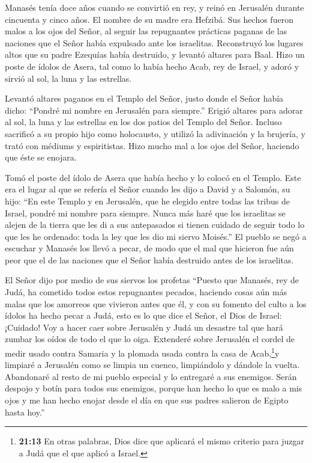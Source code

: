  Manasés tenía doce años cuando se convirtió en rey, y reinó
en Jerusalén durante cincuenta y cinco años. El nombre de su madre era
Hefzibá.  Sus hechos fueron malos a los ojos del Señor, al
seguir las repugnantes prácticas paganas de las naciones que el Señor
había expulsado ante los israelitas.  Reconstruyó los
lugares altos que su padre Ezequías había destruido, y levantó altares
para Baal. Hizo un poste de ídolos de Asera, tal como lo había hecho
Acab, rey de Israel, y adoró y sirvió al sol, la luna y las estrellas.

 Levantó altares paganos en el Templo del Señor, justo donde
el Señor había dicho: ``Pondré mi nombre en Jerusalén para siempre.''
 Erigió altares para adorar al sol, la luna y las estrellas
en los dos patios del Templo del Señor.  Incluso sacrificó a
su propio hijo como holocausto, y utilizó la adivinación y la brujería,
y trató con médiums y espiritistas. Hizo mucho mal a los ojos del Señor,
haciendo que éste se enojara.

 Tomó el poste del ídolo de Asera que había hecho y lo
colocó en el Templo. Este era el lugar al que se refería el Señor cuando
les dijo a David y a Salomón, su hijo: ``En este Templo y en Jerusalén,
que he elegido entre todas las tribus de Israel, pondré mi nombre para
siempre.  Nunca más haré que los israelitas se alejen de la
tierra que les di a sus antepasados si tienen cuidado de seguir todo lo
que les he ordenado: toda la ley que les dio mi siervo Moisés.''
 El pueblo se negó a escuchar y Manasés los llevó a pecar,
de modo que el mal que hicieron fue aún peor que el de las naciones que
el Señor había destruido antes de los israelitas.

 El Señor dijo por medio de sus siervos los profetas
 ``Puesto que Manasés, rey de Judá, ha cometido todos estos
repugnantes pecados, haciendo cosas aún más malas que los amorreos que
vivieron antes que él, y con su fomento del culto a los ídolos ha hecho
pecar a Judá,  esto es lo que dice el Señor, el Dios de
Israel: ¡Cuidado! Voy a hacer caer sobre Jerusalén y Judá un desastre
tal que hará zumbar los oídos de todo el que lo oiga. 
Extenderé sobre Jerusalén el cordel de medir usado contra Samaria y la
plomada usada contra la casa de Acab,\footnote{\textbf{21:13} En otras
  palabras, Dios dice que aplicará el mismo criterio para juzgar a Judá
  que el que aplicó a Israel.}y limpiaré a Jerusalén como se limpia un
cuenco, limpiándolo y dándole la vuelta.  Abandonaré al
resto de mi pueblo especial y lo entregaré a sus enemigos. Serán despojo
y botín para todos sus enemigos,  porque han hecho lo que
es malo a mis ojos y me han hecho enojar desde el día en que sus padres
salieron de Egipto hasta hoy.''


